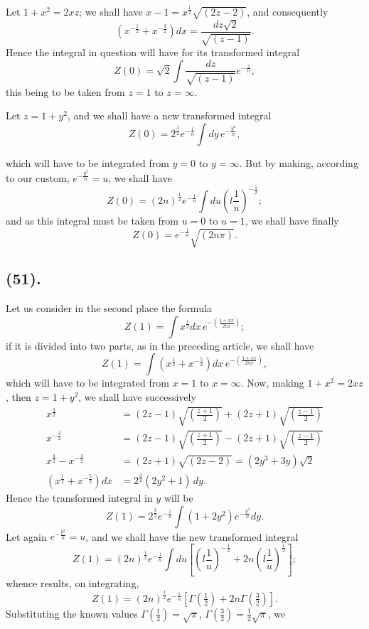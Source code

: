 \documentclass{article}
\begin{document}
Let $1+x^{2}=2xz$; we shall have $x-1=x^{\frac{1}{2}}\sqrt{(2z-2)}$, and consequently
\[ \left(x^{-\frac{1}{2}}+x^{-\frac{3}{2}}\right)dx=\frac{dz\sqrt{2}}{\sqrt{(z-1)}}. \]
Hence the integral in question will have for its transformed integral
\[ Z(0)=\sqrt{2}\int\frac{dz}{\sqrt{(z-1)}}e^{-\frac{z}{n}}, \]
this being to be taken from $z=1$ to $z=\infty$.

Let $z=1+y^{2}$, and we shall have a new transformed integral
\[ Z(0)=2^{\frac{3}{2}}e^{-\frac{1}{n}}\int dy\,e^{-\frac{y^{2}}{n}}, \]

which will have to be integrated from $y=0$ to $y=\infty$. But by making, according to our custom, $e^{-\frac{y^{2}}{n}}=u$, we shall have
\[ Z(0)=(2n)^{\frac{1}{2}}e^{-\frac{1}{n}}\int du\left(l\frac{1}{u}\right)^{-\frac{1}{2}}; \]
and as this integral must be taken from $u=0$ to $u=1$, we shall have finally
\[ Z(0)=e^{-\frac{1}{n}}\sqrt{(2n\pi)}. \tag{1} \]

\subsection*{(51).}

Let us consider in the second place the formula
\[ Z(1)=\int x^{\frac{1}{2}}dx\,e^{-\left(\frac{1+xx}{2nx}\right)}; \]
if it is divided into two parts, as in the preceding article, we shall have
\[ Z(1)=\int\left(x^{\frac{1}{2}}+x^{-\frac{5}{2}}\right)dx\,e^{-\left(\frac{1+xx}{2nx}\right)}, \]
which will have to be integrated from $x=1$ to $x=\infty$. Now, making $1+x^{2}=2xz$, then $z=1+y^{2}$, we shall have successively
\[ \begin{aligned} x^{\frac{3}{2}}&=(2z-1)\sqrt{\left(\frac{z+1}{2}\right)}+(2z+1)\sqrt{\left(\frac{z-1}{2}\right)}\\ x^{-\frac{3}{2}}&=(2z-1)\sqrt{\left(\frac{z+1}{2}\right)}-(2z+1)\sqrt{\left(\frac{z-1}{2}\right)}\\ x^{\frac{3}{2}}-x^{-\frac{3}{2}}&=(2z+1)\sqrt{(2z-2)}=(2y^{3}+3y)\sqrt{2}\\ \left(x^{\frac{1}{2}}+x^{-\frac{5}{2}}\right)dx&=2^{\frac{3}{2}}(2y^{2}+1)\,dy. \end{aligned} \]
Hence the transformed integral in $y$ will be
\[ Z(1)=2^{\frac{3}{2}}e^{-\frac{1}{n}}\int(1+2y^{2})e^{-\frac{y^{2}}{n}}dy. \]
Let again $e^{-\frac{y^{2}}{n}}=u$, and we shall have the new transformed integral
\[ Z(1)=(2n)^{\frac{1}{2}}e^{-\frac{1}{n}}\int du\left[\left(l\frac{1}{u}\right)^{-\frac{1}{2}}+2n\left(l\frac{1}{u}\right)^{\frac{1}{2}}\right]; \]
whence results, on integrating,
\[ Z(1)=(2n)^{\frac{1}{2}}e^{-\frac{1}{n}}\left[\Gamma(\tfrac{1}{2})+2n\Gamma(\tfrac{3}{2})\right]. \]
Substituting the known values $\Gamma(\frac{1}{2})=\sqrt{\pi}$, $\Gamma(\frac{3}{2})=\frac{1}{2}\sqrt{\pi}$, we
\end{document}
